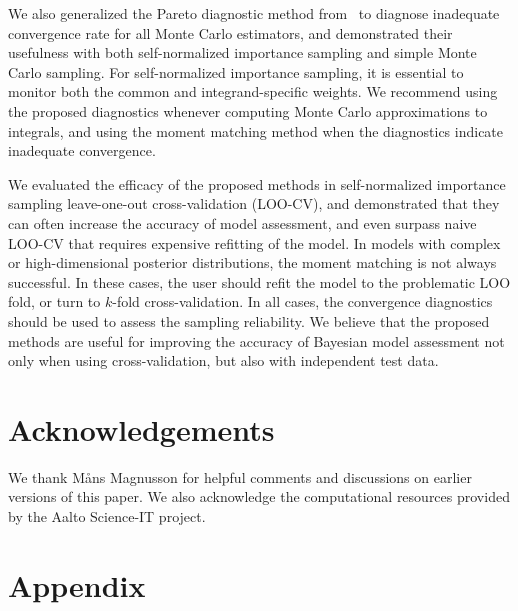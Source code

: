 \documentclass[12pt]{article}
\begin{document}
We also generalized the Pareto diagnostic method from~\citet{vehtari2015pareto}
to diagnose inadequate convergence rate for all Monte Carlo estimators, and
demonstrated their usefulness with both self-normalized importance sampling
and simple Monte Carlo sampling. For self-normalized importance sampling, it is essential
to monitor both the common and integrand-specific weights.
We recommend using the proposed diagnostics
whenever computing Monte Carlo approximations to integrals, and
using the moment matching method when the diagnostics indicate inadequate convergence.





We evaluated the efficacy of the proposed methods in self-normalized importance sampling leave-one-out
cross-validation (LOO-CV), and demonstrated that they can often increase the accuracy
of model assessment, and even surpass naive LOO-CV that requires expensive
refitting of the model.
%
%
In models with complex or high-dimensional posterior
distributions, the moment matching is not always successful.
In these cases, the user should
refit the model to the problematic LOO fold, or turn to $k$-fold cross-validation.
In all cases, the convergence diagnostics should be used
to assess the sampling reliability.
We believe that the proposed methods are useful for improving the accuracy of Bayesian model assessment
not only when using cross-validation, but also with independent test data.









\section{Acknowledgements}

We thank M{\aa}ns Magnusson for helpful comments and discussions on earlier versions of this paper.
We also acknowledge the computational resources provided by the Aalto Science-IT project.


%
%
%


%



\onecolumn
\clearpage



\section*{Appendix}
\end{document}
